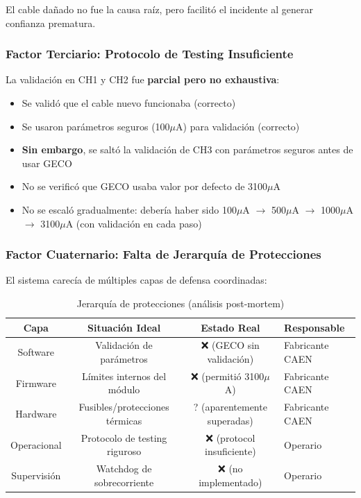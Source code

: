 \documentclass{article}
\begin{document}
El cable dañado no fue la causa raíz, pero facilitó el incidente al generar confianza prematura.

\subsubsection{Factor Terciario: Protocolo de Testing Insuficiente}

La validación en CH1 y CH2 fue \textbf{parcial pero no exhaustiva}:

\begin{itemize}
    \item Se validó que el cable nuevo funcionaba (correcto)
    \item Se usaron parámetros seguros (100\(\mu\)A) para validación (correcto)
    \item \textbf{Sin embargo}, se saltó la validación de CH3 con parámetros seguros antes de usar GECO
    \item No se verificó que GECO usaba valor por defecto de 3100\(\mu\)A
    \item No se escaló gradualmente: debería haber sido 100\(\mu\)A $\rightarrow$ 500\(\mu\)A $\rightarrow$ 1000\(\mu\)A $\rightarrow$ 3100\(\mu\)A (con validación en cada paso)
\end{itemize}

\subsubsection{Factor Cuaternario: Falta de Jerarquía de Protecciones}

El sistema carecía de múltiples capas de defensa coordinadas:

\begin{table}[h]
    \centering
    \begin{tabular}{|c|c|c|l|}
        \hline
        \textbf{Capa} & \textbf{Situación Ideal} & \textbf{Estado Real} & \textbf{Responsable} \\
        \hline
        \hline
        Software & Validación de parámetros & ❌ (GECO sin validación) & Fabricante CAEN \\
        Firmware & Límites internos del módulo & ❌ (permitió 3100\(\mu\)A) & Fabricante CAEN \\
        Hardware & Fusibles/protecciones térmicas & ? (aparentemente superadas) & Fabricante CAEN \\
        Operacional & Protocolo de testing riguroso & ❌ (protocol insuficiente) & Operario \\
        Supervisión & Watchdog de sobrecorriente & ❌ (no implementado) & Operario \\
        \hline
    \end{tabular}
    \caption{Jerarquía de protecciones (análisis post-mortem)}
\end{table}
\end{document}
